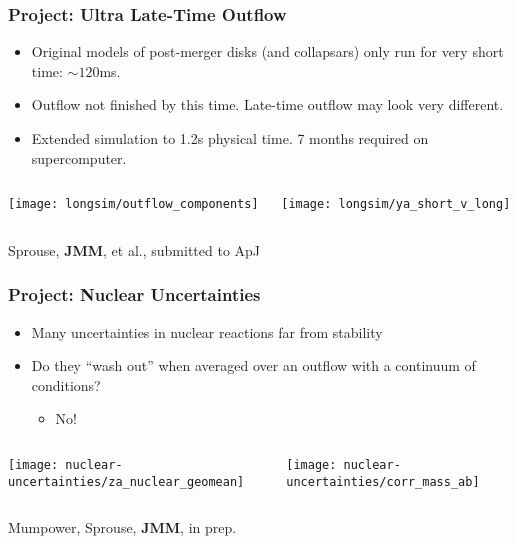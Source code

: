 \documentclass[]{beamer}
\begin{document}
\begin{frame}
  \frametitle{Project: Ultra Late-Time Outflow}
  \begin{itemize}
  \item Original models of post-merger disks (and collapsars) only run
    for very short time: $\sim 120$ms.
  \item Outflow not finished by this time. Late-time outflow may look
    very different.
  \item Extended simulation to 1.2s physical time. 7 months required
    on supercomputer.
  \end{itemize}
  \begin{columns}
    \begin{column}{6cm}
      \begin{center}
        \texttt{[image: longsim/outflow\_components]}
      \end{center}
    \end{column}
    \begin{column}{6cm}
      \begin{center}
        \texttt{[image: longsim/ya\_short\_v\_long]}
      \end{center}
    \end{column}
  \end{columns}
  {\footnotesize Sprouse, \textbf{JMM}, et al., submitted to ApJ}
\end{frame}

\begin{frame}
  \frametitle{Project: Nuclear Uncertainties}
  \begin{itemize}
  \item Many uncertainties in nuclear reactions far from stability
  \item Do they ``wash out'' when averaged over an outflow with a continuum of conditions?
    \begin{itemize}
    \item No!
    \end{itemize}
  \end{itemize}
  \begin{columns}
    \begin{column}{6cm}
      \begin{center}
        \texttt{[image: nuclear-uncertainties/za\_nuclear\_geomean]}
      \end{center}
    \end{column}
    \begin{column}{6cm}
      \begin{center}
        \texttt{[image: nuclear-uncertainties/corr\_mass\_ab]}
      \end{center}
    \end{column}
  \end{columns}
  {\footnotesize Mumpower, Sprouse, \textbf{JMM}, in prep.}
\end{frame}
\end{document}
